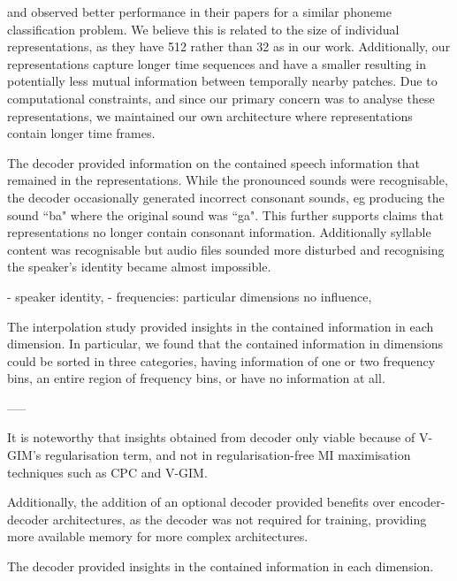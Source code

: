	\cite{oordRepresentationLearningContrastive2019} and \cite{lowePuttingEndEndtoEnd2020} observed better performance in their papers for a similar phoneme classification problem. We believe this is related to the size of individual representations, as they have 512 rather than 32 as in our work. Additionally, our representations capture longer time sequences and have a smaller resulting in potentially less mutual information between temporally nearby patches. Due to computational constraints, and since our primary concern was to analyse these representations, we maintained our own architecture where representations contain longer time frames.
	
	The decoder provided information on the contained speech information that remained in the representations. While the pronounced sounds were recognisable, the decoder occasionally generated incorrect consonant sounds, eg producing the sound ``ba" where the original sound was ``ga". This further supports claims that representations no longer contain consonant information. Additionally syllable content was recognisable but audio files sounded more disturbed and recognising the speaker's identity became almost impossible.
	
		

	
	
	
	
		- speaker identity, 
		- frequencies: particular dimensions no influence, 
	
	The interpolation study provided insights in the contained information in each dimension. In particular, we found that the contained information in dimensions could be sorted in three categories, having information of one or two frequency bins, an entire region of frequency bins, or have no information at all.
	
	-----
	
	It is noteworthy that insights obtained from decoder only viable because of V-GIM's regularisation term, and not in regularisation-free MI maximisation techniques such as CPC and V-GIM.
	
	
	
	Additionally, the addition of an optional decoder provided benefits over encoder-decoder architectures, as the decoder was not required for training, providing more available memory for more complex architectures.
	
	The decoder provided insights in the contained information in each dimension.
	
